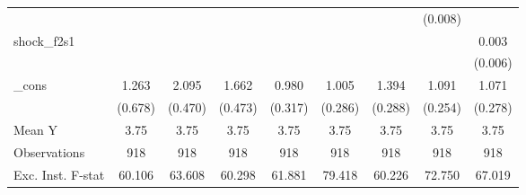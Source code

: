 {\begin{tabular}{l*{8}{c}}
            &                     &                     &                     &                     &                     &                     &     (0.008)         &                     \\
\addlinespace
shock\_f2s1  &                     &                     &                     &                     &                     &                     &                     &       0.003         \\
            &                     &                     &                     &                     &                     &                     &                     &     (0.006)         \\
\addlinespace
\_cons      &       1.263\sym{*}  &       2.095\sym{***}&       1.662\sym{***}&       0.980\sym{***}&       1.005\sym{***}&       1.394\sym{***}&       1.091\sym{***}&       1.071\sym{***}\\
            &     (0.678)         &     (0.470)         &     (0.473)         &     (0.317)         &     (0.286)         &     (0.288)         &     (0.254)         &     (0.278)         \\
\midrule
Mean Y      &        3.75         &        3.75         &        3.75         &        3.75         &        3.75         &        3.75         &        3.75         &        3.75         \\
Observations&         918         &         918         &         918         &         918         &         918         &         918         &         918         &         918         \\
Exc. Inst. F-stat&      60.106         &      63.608         &      60.298         &      61.881         &      79.418         &      60.226         &      72.750         &      67.019         \\
\bottomrule
\end{tabular}
}
